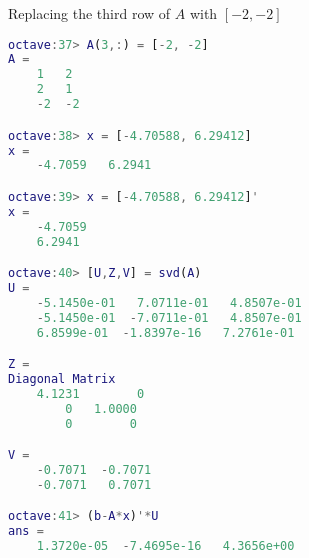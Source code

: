 \documentclass{article}
\begin{document}
Replacing the third row of $A$ with $[-2, -2]$
\begin{lstlisting}[language=MATLAB]
octave:37> A(3,:) = [-2, -2]
A =
    1   2
    2   1
    -2  -2

octave:38> x = [-4.70588, 6.29412]
x =
    -4.7059   6.2941

octave:39> x = [-4.70588, 6.29412]'
x =
    -4.7059
    6.2941

octave:40> [U,Z,V] = svd(A)
U =
    -5.1450e-01   7.0711e-01   4.8507e-01
    -5.1450e-01  -7.0711e-01   4.8507e-01
    6.8599e-01  -1.8397e-16   7.2761e-01

Z =
Diagonal Matrix
    4.1231        0
        0   1.0000
        0        0

V =
    -0.7071  -0.7071
    -0.7071   0.7071

octave:41> (b-A*x)'*U
ans =
    1.3720e-05  -7.4695e-16   4.3656e+00
    
\end{lstlisting}








\end{document}
